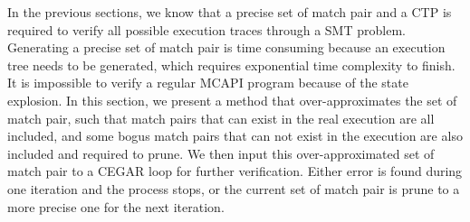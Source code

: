 In the previous sections, we know that a precise set of match pair and a CTP is required to verify all possible execution traces through a SMT problem. Generating a precise set of match pair is time consuming because an execution tree needs to be generated, which requires exponential time complexity to finish. It is impossible to verify a regular MCAPI program because of the state explosion. In this section, we present a method that over-approximates the set of match pair, such that match pairs that can exist in the real execution are all included, and some bogus match pairs that can not exist in the execution are also included and required to prune. We then input this over-approximated set of match pair to a CEGAR loop for further verification. Either error is found during one iteration and the process stops, or the current set of match pair is prune to a more precise one for the next iteration. 




